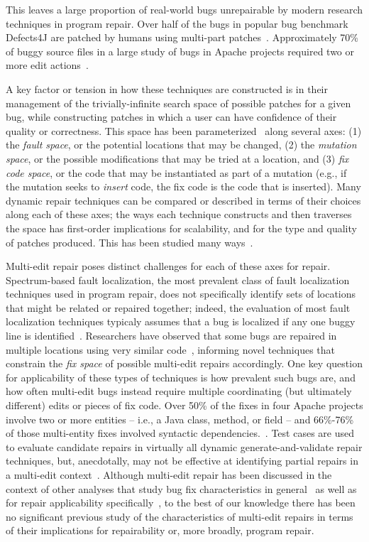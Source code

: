 \documentclass[sigconf, timestamp-false, anonymous=true]{acmart}
\begin{document}
This leaves a large proportion of real-world bugs unrepairable by modern
research techniques in program repair.  Over half of the bugs in popular bug
benchmark Defects4J are patched by humans using multi-part
patches~\cite{d4j-dissection}. Approximately 70\% of buggy source files in a
large study of bugs in Apache projects required two or more edit
actions~\cite{zhong2015}.

A key factor or tension in how these techniques are constructed is in their
management of the trivially-infinite search space of possible patches for a
given bug, while constructing patches in which a user can have confidence of
their quality or correctness.  This space has been parameterized~\cite{refs}
along several axes: (1) the \emph{fault space}, or the potential locations that
may be changed, (2) the \emph{mutation space}, or the possible modifications
that may be tried at a location, and (3) \emph{fix code space}, or the code that may
be instantiated as part of a mutation (e.g., if the mutation seeks to
\emph{insert} code, the fix code is the code that is inserted).  Many dynamic
repair techniques can be compared or described in terms of their choices along
each of these axes; the ways each technique constructs and then traverses the
space has first-order implications for scalability, and for the type and quality
of patches produced.  This has been studied many ways~\cite{examples}.

Multi-edit repair poses distinct challenges for each of these axes for repair.  
Spectrum-based fault localization, the most
prevalent class of fault localization techniques used in program repair, does
not specifically identify sets of locations that might be related or repaired
together; indeed, the evaluation of most fault localization
techniques typicaly assumes that a bug is localized if any one buggy line is
identified~\cite{fl-survey-wong}.  Researchers have observed that some bugs are
repaired in multiple locations using very similar
code~\cite{saha2019harnessing,jiang2019cmsuggester}, informing novel techniques
that constrain the \emph{fix space} of possible multi-edit repairs accordingly.
One key question for applicability of these types of techniques is how prevalent
such bugs are, and how often multi-edit bugs instead require multiple
coordinating (but ultimately different) edits or pieces of fix code.  Over 50\% of the fixes in four 
Apache projects involve two or more entities -- i.e., a Java class, method, or field -- and 66\%-76\% of 
those multi-entity fixes involved syntactic dependencies.~\cite{wang2018}. 
Test cases are used to evaluate candidate repairs in virtually all dynamic
generate-and-validate repair techniques, but, anecdotally, may not be effective
at identifying partial repairs in a multi-edit
context~\cite{fitness10,maybeeric}.  
Although multi-edit repair has been discussed in the context of other analyses
that study bug fix characteristics in general~\cite{examples} as well as for
repair applicability specifically~\cite{moar,examples}, to the best of our
knowledge there has been no significant previous study of the characteristics of
multi-edit repairs in terms of their implications for repairability or, more
broadly, program repair.  
\end{document}
